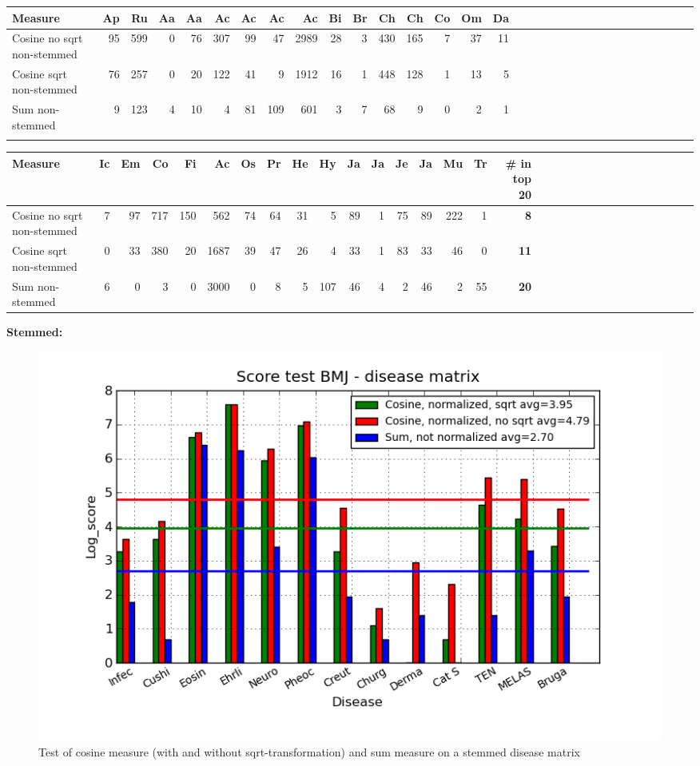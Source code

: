 \begin{table}[H]
  \label{testResult_diseaseMatrix_orphan_hist_NOTnorm_3000_ns_cos_sqrt_cos_sum_nn}
  \begin{tiny}
    \begin{tabular}{|l|r|r|r|r|r|r|r|r|r|r|r|r|r|r|r|r|r|r|r|r|r|r|r|r|r|r|r|r|r|r|r|}
      \hline
      Measure &Ap&Ru&Aa&Aa&Ac&Ac&Ac&Ac&Bi&Br&Ch&Ch&Co&Om&Da\\
      \hline
      Cosine no sqrt non-stemmed &95&599&0&76&307&99&47&2989&28&3&430&165&7&37&11 \\
      \hline
      Cosine sqrt non-stemmed &76&257&0&20&122&41&9&1912&16&1&448&128&1&13&5 \\
      \hline
      Sum non-stemmed &9&123&4&10&4&81&109&601&3&7&68&9&0&2&1\\
      \hline
      \multicolumn{16}{c}{} \\
    \end{tabular}
    \begin{tabular}{|l|r|r|r|r|r|r|r|r|r|r|r|r|r|r|r|r|r|r|r|r|r|r|r|r|r|r|r|r|r|r|}
      \hline
      Measure &Ic&Em&Co&Fi&Ac&Os&Pr&He&Hy&Ja&Ja&Je&Ja&Mu&Tr &  \scriptsize{\textbf{\# in top 20}} \\
      \hline
      Cosine no sqrt non-stemmed &7&97&717&150&562&74&64&31&5&89&1&75&89&222&1 & \scriptsize{\textbf{8}} \\
      \hline
      Cosine sqrt non-stemmed &0&33&380&20&1687&39&47&26&4&33&1&83&33&46&0 &\scriptsize{\textbf{11}} \\
      \hline
      Sum non-stemmed &6&0&3&0&3000&0&8&5&107&46&4&2&46&2&55 & \scriptsize{\textbf{20}} \\
      \hline
    \end{tabular}
  \end{tiny}
\end{table}

\textbf{Stemmed:}

\begin{figure}[H]
  \caption{Test of cosine measure (with and without sqrt-transformation) and sum measure on a stemmed disease matrix}
  \begin{center}
    \includegraphics[width=1.2\textwidth]{barcharts/diseaseMatrix_bmj_hist_norm_3000_s_cos_sqrt_cos_sum_nn.png}
  \end{center}
  \label{diseaseMatrix_bmj_hist_norm_3000_s_cos_sqrt_cos_sum_nn}
\end{figure}


